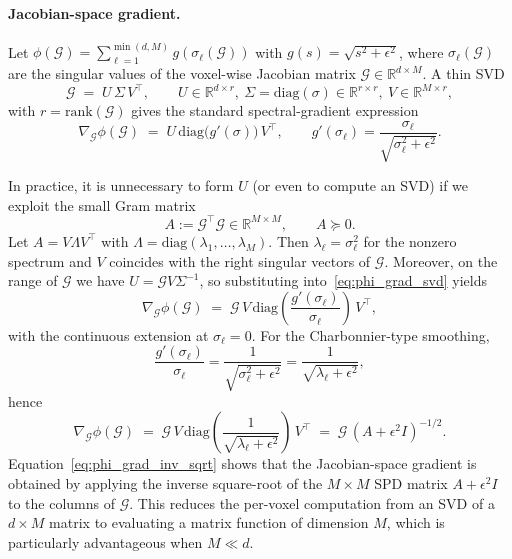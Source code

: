 \paragraph{Jacobian-space gradient.}
Let $\phi(\mathcal{G})=\sum_{\ell=1}^{\min(d,M)} g(\sigma_\ell(\mathcal{G}))$ with $g(s)=\sqrt{s^2+\epsilon^2}$, where $\sigma_\ell(\mathcal{G})$ are the singular values of the voxel-wise Jacobian matrix $\mathcal{G}\in\mathbb{R}^{d\times M}$. A thin SVD
\begin{equation}
\mathcal{G} \;=\; U\,\Sigma\,V^\top,
\qquad
U\in\mathbb{R}^{d\times r},\ \Sigma=\mathrm{diag}(\sigma)\in\mathbb{R}^{r\times r},\ V\in\mathbb{R}^{M\times r},
\end{equation}
with $r=\mathrm{rank}(\mathcal{G})$ gives the standard spectral-gradient expression
\begin{equation}\label{eq:phi_grad_svd}
\nabla_{\mathcal{G}} \phi(\mathcal{G})
\;=\;
U\,\mathrm{diag}\!\bigl(g'(\sigma)\bigr)\,V^\top,
\qquad
g'(\sigma_\ell)=\frac{\sigma_\ell}{\sqrt{\sigma_\ell^2+\epsilon^2}}.
\end{equation}

In practice, it is unnecessary to form $U$ (or even to compute an SVD) if we exploit the small Gram matrix
\begin{equation}
A := \mathcal{G}^\top \mathcal{G}\in\mathbb{R}^{M\times M},
\qquad A\succeq 0.
\end{equation}
Let $A=V\Lambda V^\top$ with $\Lambda=\mathrm{diag}(\lambda_1,\dots,\lambda_M)$. Then $\lambda_\ell=\sigma_\ell^2$ for the nonzero spectrum and $V$ coincides with the right singular vectors of $\mathcal{G}$. Moreover, on the range of $\mathcal{G}$ we have $U=\mathcal{G}V\Sigma^{-1}$, so substituting into~\eqref{eq:phi_grad_svd} yields
\begin{equation}\label{eq:phi_grad_gram}
\nabla_{\mathcal{G}} \phi(\mathcal{G})
\;=\;
\mathcal{G}\,V\,\mathrm{diag}\!\left(\frac{g'(\sigma_\ell)}{\sigma_\ell}\right)\,V^\top,
\end{equation}
with the continuous extension at $\sigma_\ell=0$. For the Charbonnier-type smoothing,
\begin{equation}
\frac{g'(\sigma_\ell)}{\sigma_\ell}
=
\frac{1}{\sqrt{\sigma_\ell^2+\epsilon^2}}
=
\frac{1}{\sqrt{\lambda_\ell+\epsilon^2}},
\end{equation}
hence
\begin{equation}\label{eq:phi_grad_inv_sqrt}
\nabla_{\mathcal{G}} \phi(\mathcal{G})
\;=\;
\mathcal{G}\,V\,\mathrm{diag}\!\left(\frac{1}{\sqrt{\lambda_\ell+\epsilon^2}}\right)\,V^\top
\;=\;
\mathcal{G}\,(A+\epsilon^2 I)^{-1/2}.
\end{equation}
Equation~\eqref{eq:phi_grad_inv_sqrt} shows that the Jacobian-space gradient is obtained by applying the inverse square-root of the $M\times M$ SPD matrix $A+\epsilon^2 I$ to the columns of $\mathcal{G}$. This reduces the per-voxel computation from an SVD of a $d\times M$ matrix to evaluating a matrix function of dimension $M$, which is particularly advantageous when $M\ll d$.

